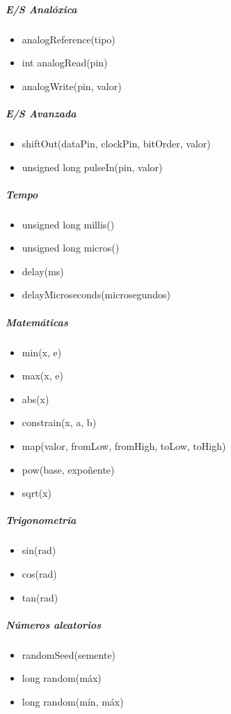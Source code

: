    \subparagraph{E/S Analóxica}

    \begin{itemize}
     \item analogReference(tipo)
     \item int analogRead(pin)
     \item analogWrite(pin, valor)
    \end{itemize}

    \subparagraph{E/S Avanzada}

    \begin{itemize}
     \item shiftOut(dataPin, clockPin, bitOrder, valor)
     \item unsigned long pulseIn(pin, valor)
    \end{itemize}

    \subparagraph{Tempo}

    \begin{itemize}
     \item unsigned long millis()
     \item unsigned long micros()
     \item delay(ms)
     \item delayMicroseconds(microsegundos)
    \end{itemize}

    \subparagraph{Matemáticas}

    \begin{itemize}
     \item min(x, e)
     \item max(x, e)
     \item abs(x)
     \item constrain(x, a, b)
     \item map(valor, fromLow, fromHigh, toLow, toHigh)
     \item pow(base, expoñente)
     \item sqrt(x)
    \end{itemize}

    \subparagraph{Trigonometría}

    \begin{itemize}
     \item sin(rad)
     \item cos(rad)
     \item tan(rad)
    \end{itemize}

    \subparagraph{Números aleatorios}

    \begin{itemize}
     \item randomSeed(semente)
     \item long random(máx)
     \item long random(mín, máx)
    \end{itemize}

